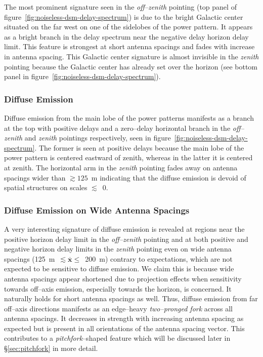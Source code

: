 \documentclass[preprint2,iop,numberedappendix]{emulateapj}
\begin{document}
The most prominent signature seen in the {\it off--zenith} pointing (top panel of figure~\ref{fig:noiseless-dsm-delay-spectrum}) is due to the bright Galactic center situated on the far west on one of the sidelobes of the power pattern. It appears as a bright branch in the delay spectrum near the negative delay horizon delay limit. This feature is strongest at short antenna spacings and fades with increase in antenna spacing. This Galactic center signature is almost invisible in the {\it zenith} pointing because the Galactic center has already set over the horizon (see bottom panel in figure~\ref{fig:noiseless-dsm-delay-spectrum}). 

\subsubsection{Diffuse Emission}\label{sec:diffuse-features}

Diffuse emission from the main lobe of the power patterns manifests as a branch at the top with positive delays and a zero--delay horizontal branch in the {\it off--zenith} and {\it zenith} pointings respectively, seen in figure~\ref{fig:noiseless-dsm-delay-spectrum}. The former is seen at positive delays because the main lobe of the power pattern is centered eastward of zenith, whereas in the latter it is centered at zenith. The horizontal arm in the {\it zenith} pointing fades away on antenna spacings wider than $\gtrsim 125$~m indicating that the diffuse emission is devoid of spatial structures on scales $\lesssim$~0. 

\subsubsection{Diffuse Emission on Wide Antenna Spacings}\label{sec:diffuse-long-baselines}

A very interesting signature of diffuse emission is revealed at regions near the positive horizon delay limit in the {\it off--zenith} pointing and at both positive and negative horizon delay limits in the {\it zenith} pointing even on wide antenna spacings (125~m~$\lesssim \overline{\mathbf{x}}\le$~200~m) contrary to expectations, which are not expected to be sensitive to diffuse emission. We claim this is because wide antenna spacings appear shortened due to projection effects when sensitivity towards off--axis emission, especially towards the horizon, is concerned. It naturally holds for short antenna spacings as well. Thus, diffuse emission from far off--axis directions manifests as an edge--heavy {\it two--pronged fork} across all antenna spacings. It decreases in strength with increasing antenna spacing as expected but is present in all orientations of the antenna spacing vector. This contributes to a {\it pitchfork}--shaped feature which will be discussed later in \S\ref{sec:pitchfork} in more detail.
\end{document}
